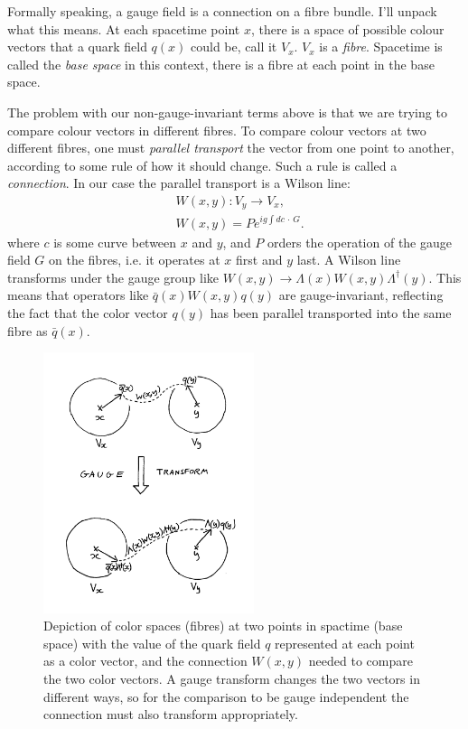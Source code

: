 Formally speaking, a gauge field is a connection on a fibre bundle. I'll unpack what this means. At each spacetime point $x$, there is a space of possible colour vectors that a quark field $q(x)$ could be, call it $V_x$. $V_x$ is a {\it{fibre}}. Spacetime is called the {\it{base space}} in this context, there is a fibre at each point in the base space.

The problem with our non-gauge-invariant terms above is that we are trying to compare colour vectors in different fibres. To compare colour vectors at two different fibres, one must {\it{parallel transport}} the vector from one point to another, according to some rule of how it should change. Such a rule is called a {\it{connection}}. In our case the parallel transport is a Wilson line:
\begin{align}
  \nonumber  &W(x,y) : V_y \to V_x, \\ &W(x,y) = Pe^{ig\int dc\,\cdot\, G }.
\end{align}
where $c$ is some curve between $x$ and $y$, and $P$ orders the operation of the gauge field $G$ on the fibres, i.e. it operates at $x$ first and $y$ last. A Wilson line transforms under the gauge group like $W(x,y)\to \Lambda(x)W(x,y)\Lambda^{\dagger}(y)$. This means that operators like $\bar{q}(x)W(x,y)q(y)$ are gauge-invariant, reflecting the fact that the color vector $q(y)$ has been parallel transported into the same fibre as $\bar{q}(x)$.

\begin{figure}[htb!]
  \begin{center}
    \vspace{-10pt}
    \includegraphics[width=0.55\textwidth]{images/fibres.jpg}
    \caption{Depiction of color spaces (fibres) at two points in spactime (base space) with the value of the quark field $q$ represented at each point as a color vector, and the connection $W(x,y)$ needed to compare the two color vectors. A gauge transform changes the two vectors in different ways, so for the comparison to be gauge independent the connection must also transform appropriately.}
  \end{center}
  \vspace{-10pt}
\end{figure}

